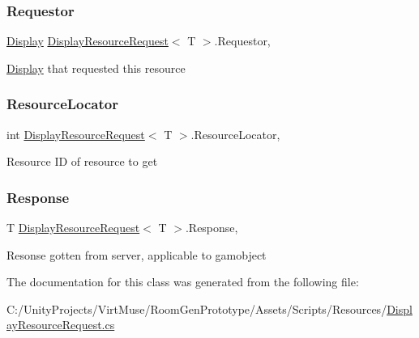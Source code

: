 \subsubsection{\texorpdfstring{Requestor}{Requestor}}
{\footnotesize\ttfamily \mbox{\hyperlink{class_display}{Display}} \mbox{\hyperlink{class_display_resource_request}{Display\+Resource\+Request}}$<$ T $>$.Requestor\hspace{0.3cm}{\ttfamily [get]}, {}}



\mbox{\hyperlink{class_display}{Display}} that requested this resource 

\mbox{\label{class_display_resource_request_af7db29f1689fbcdd4bc5a9dd40675cf1}} 
\subsubsection{\texorpdfstring{Resource\+Locator}{ResourceLocator}}
{\footnotesize\ttfamily int \mbox{\hyperlink{class_display_resource_request}{Display\+Resource\+Request}}$<$ T $>$.Resource\+Locator\hspace{0.3cm}{\ttfamily [get]}, {}}



Resource ID of resource to get 

\mbox{\label{class_display_resource_request_a95743229fd3f58ceed7090f9fd5e2fd5}} 
\subsubsection{\texorpdfstring{Response}{Response}}
{\footnotesize\ttfamily T \mbox{\hyperlink{class_display_resource_request}{Display\+Resource\+Request}}$<$ T $>$.Response\hspace{0.3cm}{\ttfamily [get]}, {}}



Resonse gotten from server, applicable to gamobject 



The documentation for this class was generated from the following file\+:\begin{DoxyCompactItemize}
\item 
C\+:/\+Unity\+Projects/\+Virt\+Muse/\+Room\+Gen\+Prototype/\+Assets/\+Scripts/\+Resources/\mbox{\hyperlink{_display_resource_request_8cs}{Display\+Resource\+Request.\+cs}}\end{DoxyCompactItemize}
